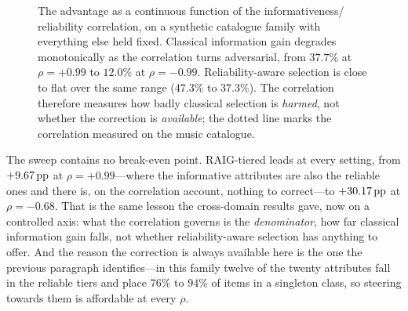 \begin{figure}[t]
\centering
{}
\caption{The advantage as a continuous function of the informativeness/
reliability correlation, on a synthetic catalogue family with everything else
held fixed. Classical information gain degrades monotonically as the
correlation turns adversarial, from $37.7\%$ at $\rho=+0.99$ to $12.0\%$ at
$\rho=-0.99$. Reliability-aware selection is close to flat over the same range
($47.3\%$ to $37.3\%$). The correlation therefore measures how badly classical
selection is \emph{harmed}, not whether the correction is \emph{available};
the dotted line marks the correlation measured on the music catalogue.}
\label{fig:rho}
\end{figure}

The sweep contains no break-even point. RAIG-tiered leads at every setting,
from $+9.67\,\text{pp}$ at $\rho = +0.99$---where the informative attributes are also
the reliable ones and there is, on the correlation account, nothing to
correct---to $+30.17\,\text{pp}$ at $\rho = -0.68$. That is the same lesson the
cross-domain results gave, now on a controlled axis: what the correlation
governs is the \emph{denominator}, how far classical information gain falls,
not whether reliability-aware selection has anything to offer. And the reason
the correction is always available here is the one the previous paragraph
identifies---in this family twelve of the twenty attributes fall in the
reliable tiers and place $76\%$ to $94\%$ of items in a singleton class, so
steering towards them is affordable at every $\rho$.

